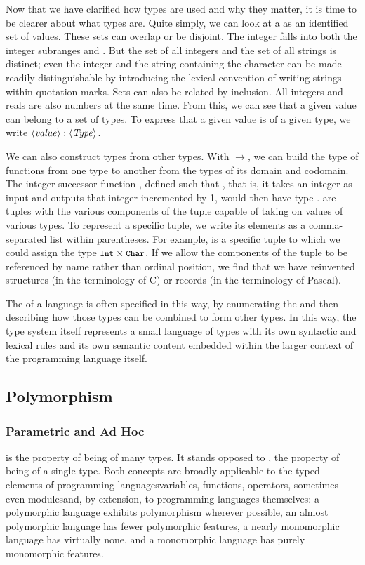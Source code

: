 Now that we have clarified how types are used and why they matter, it is time to be clearer about what types are. Quite simply, we can look at a  as an identified set of values. These sets can overlap or be disjoint. The integer  falls into both the integer subranges  and . But the set of all integers and the set of all strings is distinct; even the integer  and the string  containing the character  can be made readily distinguishable by introducing the lexical convention of writing strings within quotation marks. Sets can also be related by inclusion. All integers and reals are also numbers at the same time. From this, we can see that a given value can belong to a set of types. To express that a given value is of a given type, we write $\langle \text{\textit{value}} \rangle : \langle \text{\textit{Type}} \rangle$.

We can also construct types from other types. With $\to$, we can build the type of functions from one type to another from the types of its domain and codomain. The integer successor function , defined such that , that is, it takes an integer as input and outputs that integer incremented by 1, would then have type .  are tuples with the various components of the tuple capable of taking on values of various types. To represent a specific tuple, we write its elements as a comma-separated list within parentheses. For example,  is a specific tuple to which we could assign the type $\text{{\small\ttfamily Int}} \times \text{{\small\ttfamily Char}}$. If we allow the components of the tuple to be referenced by name rather than ordinal position, we find that we have reinvented structures (in the terminology of C) or records (in the terminology of Pascal).

The  of a language is often specified in this way, by enumerating the  and then describing how those types can be combined to form other types. In this way, the type system itself represents a small language of types with its own syntactic and lexical rules and its own semantic content embedded within the larger context of the programming language itself.

\subsection{Polymorphism}
\subsubsection{Parametric and Ad Hoc}
 is the property of being of many types. It stands opposed to , the property of being of a single type. Both concepts are broadly applicable to the typed elements of programming languages\empause variables, functions, operators, sometimes even modules\empause and, by extension, to programming languages themselves: a polymorphic language exhibits polymorphism wherever possible, an almost polymorphic language has fewer polymorphic features, a nearly monomorphic language has virtually none, and a monomorphic language has purely monomorphic features.

